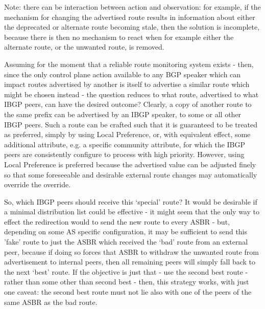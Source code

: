 Note: there can be interaction between action and observation: for example, if
the mechanism for changing the advertised route results in information about
either the deprecated or alternate route becoming stale, then the solution is
incomplete, because there is then no mechanism to react when for example either
the alternate route, or the unwanted route, is removed.

Assuming for the moment that a reliable route monitoring system exists - then,
since the only control plane action available to any BGP speaker which can
impact routes advertised by another is itself to advertise a similar route
which might be chosen instead - the question reduces to what route, advertised
to what IBGP peers, can have the desired outcome?  Clearly, a copy of another
route to the same prefix can be advertised by an IBGP speaker, to some or all
other IBGP peers.  Such a route can be crafted such that it is guaranteed to be
treated as preferred, simply by using Local Preference, or, with equivalent
effect, some additional attribute, e.g. a specific community attribute, for
which the IBGP peers are consistently configure to process with high priority.
However, using Local Preference is preferred because the advertised value can
be adjusted finely so that some  foreseeable and desirable external route
changes may automatically override the override.

So, which IBGP peers should receive this `special' route? It would be desirable
if a minimal distribution list could be effective - it might seem that the only
way to effect the redirection would to send the new route to every ASBR - but,
depending on some AS specific configuration, it may be sufficient to send this
'fake' route to just the ASBR which received the `bad' route from an external
peer, because if doing so forces that ASBR to withdraw the unwanted route  from
advertisement to internal peers, then all remaining peers will simply fall back
to the next `best' route. If the objective is just that - use the second best
route - rather than some other than second best - then, this strategy works,
with just one caveat:
the second best route must not lie also with one of the peers of the same ASBR
as the bad route.

